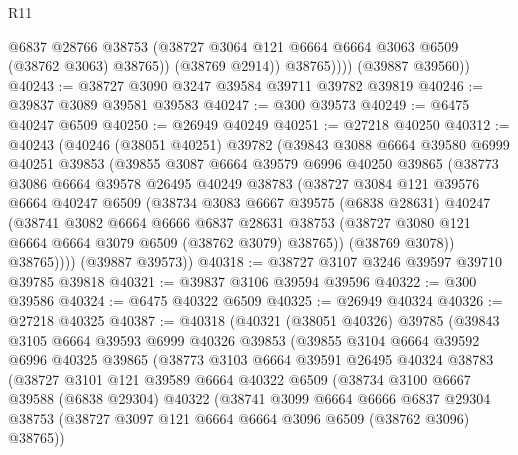 \begin{lexlean}{R11}
\begin{coremodule}
                  @6837
                  @28766
                  @38753
                  (@38727 @3064 @121 @6664 @6664 @3063 @6509 (@38762 @3063) @38765))
                (@38769 @2914))
              @38765))))
      (@39887 @39560))
@40243 := @38727 @3090 @3247 @39584 @39711 @39782 @39819
@40246 := @39837 @3089 @39581 @39583
@40247 := @300 @39573
@40249 := @6475 @40247 @6509
@40250 := @26949 @40249
@40251 := @27218 @40250
@40312 := @40243
    (@40246
      (@38051 @40251)
      @39782
      (@39843
        @3088
        @6664
        @39580
        @6999
        @40251
        @39853
        (@39855
          @3087
          @6664
          @39579
          @6996
          @40250
          @39865
          (@38773
            @3086
            @6664
            @39578
            @26495
            @40249
            @38783
            (@38727
              @3084
              @121
              @39576
              @6664
              @40247
              @6509
              (@38734
                @3083
                @6667
                @39575
                (@6838 @28631)
                @40247
                (@38741
                  @3082
                  @6664
                  @6666
                  @6837
                  @28631
                  @38753
                  (@38727 @3080 @121 @6664 @6664 @3079 @6509 (@38762 @3079) @38765))
                (@38769 @3078))
              @38765))))
      (@39887 @39573))
@40318 := @38727 @3107 @3246 @39597 @39710 @39785 @39818
@40321 := @39837 @3106 @39594 @39596
@40322 := @300 @39586
@40324 := @6475 @40322 @6509
@40325 := @26949 @40324
@40326 := @27218 @40325
@40387 := @40318
    (@40321
      (@38051 @40326)
      @39785
      (@39843
        @3105
        @6664
        @39593
        @6999
        @40326
        @39853
        (@39855
          @3104
          @6664
          @39592
          @6996
          @40325
          @39865
          (@38773
            @3103
            @6664
            @39591
            @26495
            @40324
            @38783
            (@38727
              @3101
              @121
              @39589
              @6664
              @40322
              @6509
              (@38734
                @3100
                @6667
                @39588
                (@6838 @29304)
                @40322
                (@38741
                  @3099
                  @6664
                  @6666
                  @6837
                  @29304
                  @38753
                  (@38727 @3097 @121 @6664 @6664 @3096 @6509 (@38762 @3096) @38765))

\end{coremodule}
\end{lexlean}
